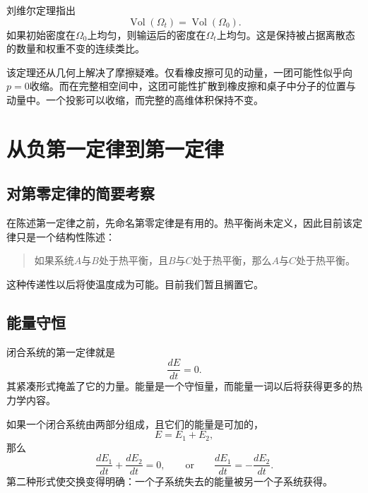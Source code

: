 刘维尔定理指出
\begin{equation}
 \operatorname{Vol}(\Omega_t)
 =
 \operatorname{Vol}(\Omega_0).
 \label{eq:sm1-liouville-volume}
\end{equation}
如果初始密度在\(\Omega_0\)上均匀，则输运后的密度在\(\Omega_t\)上均匀。这是保持被占据离散态的数量和权重不变的连续类比。

该定理还从几何上解决了摩擦疑难。仅看橡皮擦可见的动量，一团可能性似乎向\(p=0\)收缩。而在完整相空间中，这团可能性扩散到橡皮擦和桌子中分子的位置与动量中。一个投影可以收缩，而完整的高维体积保持不变。

\begin{classroomqa}
\end{classroomqa}

\section{从负第一定律到第一定律}

\subsection{对第零定律的简要考察}

在陈述第一定律之前，先命名第零定律是有用的。热平衡尚未定义，因此目前该定律只是一个结构性陈述：
\begin{quote}
如果系统\(A\)与\(B\)处于热平衡，且\(B\)与\(C\)处于热平衡，那么\(A\)与\(C\)处于热平衡。
\end{quote}
这种传递性以后将使温度成为可能。目前我们暂且搁置它。

\subsection{能量守恒}

闭合系统的第一定律就是
\begin{equation}
 \frac{dE}{dt}=0.
 \label{eq:sm1-first-law}
\end{equation}
其紧凑形式掩盖了它的力量。能量是一个守恒量，而能量一词以后将获得更多的热力学内容。

如果一个闭合系统由两部分组成，且它们的能量是可加的，
\begin{equation}
 E=E_1+E_2,
\end{equation}
那么
\begin{equation}
 \frac{dE_1}{dt}+\frac{dE_2}{dt}=0,
 \qquad\text{or}\qquad
 \frac{dE_1}{dt}=-\frac{dE_2}{dt}.
 \label{eq:sm1-energy-exchange}
\end{equation}
第二种形式使交换变得明确：一个子系统失去的能量被另一个子系统获得。

